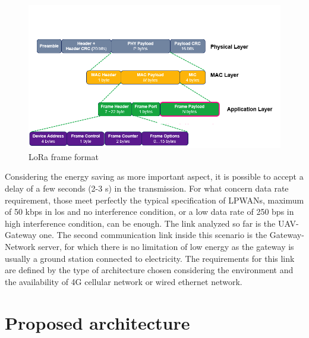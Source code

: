 \documentclass[12pt]{report}
\begin{document}
\begin{figure}[h!]
    \centering
    \includegraphics[width=14cm]{Pictures/Lora Packet.png}
    \caption{LoRa frame format}
\end{figure}
\newpage
Considering the energy saving as more important aspect, it is possible to accept 
a delay of a few seconds (2-3 s) in the transmission. For what concern data rate requirement, 
those meet perfectly the typical specification of LPWANs, maximum of 50 kbps in los and no 
interference condition, or a low data rate of 250 bps in high interference condition, can be enough. The 
link analyzed so far is the UAV-Gateway one. The second communication link inside this scenario is the Gateway-Network server, for
which there is no limitation of low energy as the gateway is usually a ground station connected
to electricity. The requirements for this link are defined by the type of architecture chosen 
considering the environment and the availability of 4G cellular network or wired ethernet 
network.


\chapter{Proposed architecture}
\end{document}
